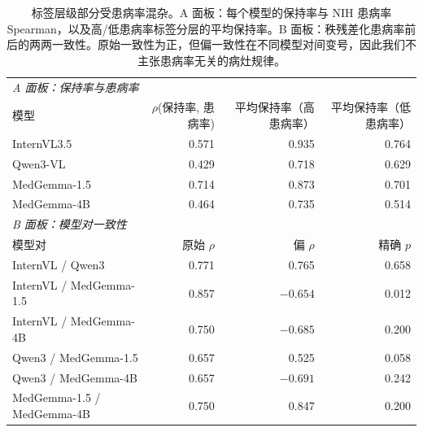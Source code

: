 \begin{table}[H]
\centering
\footnotesize
\setlength{\tabcolsep}{3pt}
\caption{标签层级部分受患病率混杂。A 面板：每个模型的保持率与 NIH 患病率 Spearman，以及高/低患病率标签分层的平均保持率。B 面板：秩残差化患病率前后的两两一致性。原始一致性为正，但偏一致性在不同模型对间变号，因此我们不主张患病率无关的病灶规律。}
\label{tab:hierarchy}
\begin{tabular}{lrrr}
\toprule
\multicolumn{4}{l}{\emph{A 面板：保持率与患病率}} \\
模型 & $\rho$(保持率, 患病率) & 平均保持率（高患病率） & 平均保持率（低患病率） \\
\midrule
InternVL3.5 & 0.571 & 0.935 & 0.764 \\
Qwen3-VL & 0.429 & 0.718 & 0.629 \\
MedGemma-1.5 & 0.714 & 0.873 & 0.701 \\
MedGemma-4B & 0.464 & 0.735 & 0.514 \\
\midrule
\multicolumn{4}{l}{\emph{B 面板：模型对一致性}} \\
模型对 & 原始 $\rho$ & 偏 $\rho$ & 精确 $p$ \\
\midrule
InternVL / Qwen3 & 0.771 & 0.765 & 0.658 \\
InternVL / MedGemma-1.5 & 0.857 & $-0.654$ & 0.012 \\
InternVL / MedGemma-4B & 0.750 & $-0.685$ & 0.200 \\
Qwen3 / MedGemma-1.5 & 0.657 & 0.525 & 0.058 \\
Qwen3 / MedGemma-4B & 0.657 & $-0.691$ & 0.242 \\
MedGemma-1.5 / MedGemma-4B & 0.750 & 0.847 & 0.200 \\
\bottomrule
\end{tabular}
\end{table}

